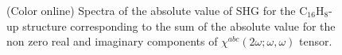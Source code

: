 \documentclass[pss]{wiley2sp} %
\begin{document}
\begin{figure}[t]
\caption{(Color online) Spectra of the absolute value of SHG for the
    C$_{16}$H$_{8}$-up structure corresponding to the
    sum of the absolute value for the non zero real and imaginary components
    of $\chi^{abc}(2\omega;\omega,
    \omega) $ tensor.\label{fig:up-shg-abs}}
\end{figure}
\end{document}
